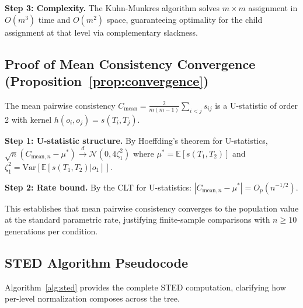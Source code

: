 \documentclass{article}
\theoremstyle{plain}
\theoremstyle{definition}
\begin{document}
\textbf{Step 3: Complexity.} The Kuhn-Munkres algorithm solves $m \times m$ assignment in $O(m^3)$ time and $O(m^2)$ space, guaranteeing optimality for the child assignment at that level via complementary slackness.

\subsection{Proof of Mean Consistency Convergence (Proposition~\ref{prop:convergence})}

The mean pairwise consistency $C_{\text{mean}} = \frac{2}{m(m-1)} \sum_{i<j} s_{ij}$ is a U-statistic of order 2 with kernel $h(o_i, o_j) = s(T_i, T_j)$.

\textbf{Step 1: U-statistic structure.}
By Hoeffding's theorem for U-statistics, $\sqrt{n}(C_{\text{mean},n} - \mu^*) \xrightarrow{d} \mathcal{N}(0, 4\zeta_1^2)$ where $\mu^* = \mathbb{E}[s(T_1, T_2)]$ and $\zeta_1^2 = \text{Var}[\mathbb{E}[s(T_1, T_2) | o_1]]$.

\textbf{Step 2: Rate bound.}
By the CLT for U-statistics: $|C_{\text{mean},n} - \mu^*| = O_p(n^{-1/2})$.

This establishes that mean pairwise consistency converges to the population value at the standard parametric rate, justifying finite-sample comparisons with $n \geq 10$ generations per condition.

\subsection{STED Algorithm Pseudocode}
\label{sec:pseudocode}

Algorithm~\ref{alg:sted} provides the complete STED computation, clarifying how per-level normalization composes across the tree.
\end{document}
